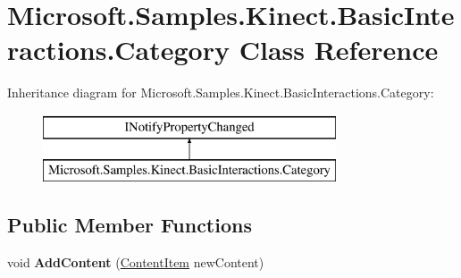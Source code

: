 \hypertarget{class_microsoft_1_1_samples_1_1_kinect_1_1_basic_interactions_1_1_category}{\section{Microsoft.\-Samples.\-Kinect.\-Basic\-Interactions.\-Category Class Reference}
\label{class_microsoft_1_1_samples_1_1_kinect_1_1_basic_interactions_1_1_category}
}
Inheritance diagram for Microsoft.\-Samples.\-Kinect.\-Basic\-Interactions.\-Category\-:\begin{figure}[H]
\begin{center}
\leavevmode
\includegraphics[height=2.000000cm]{class_microsoft_1_1_samples_1_1_kinect_1_1_basic_interactions_1_1_category}
\end{center}
\end{figure}
\subsection*{Public Member Functions}
\begin{DoxyCompactItemize}
\item 
\hypertarget{class_microsoft_1_1_samples_1_1_kinect_1_1_basic_interactions_1_1_category_a0ca197218bc462299e835bb2d4719f34}{void {\bfseries Add\-Content} (\hyperlink{class_microsoft_1_1_samples_1_1_kinect_1_1_basic_interactions_1_1_content_item}{Content\-Item} new\-Content)}\label{class_microsoft_1_1_samples_1_1_kinect_1_1_basic_interactions_1_1_category_a0ca197218bc462299e835bb2d4719f34}

\end{DoxyCompactItemize}
